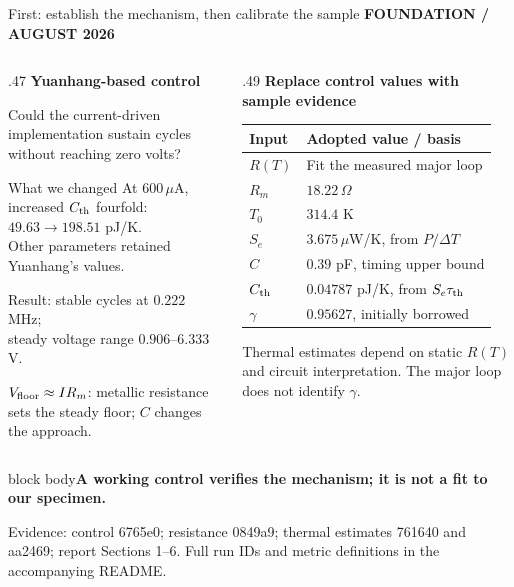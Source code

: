 \documentclass[aspectratio=169,11pt]{beamer}
\newcommand{\eyebrow}[1]{{\color{teal}\scriptsize\bfseries\MakeUppercase{#1}}\par\vspace{2mm}}
\newcommand{\takeaway}[1]{\par\vspace{2mm}\begin{beamercolorbox}[sep=2mm,wd=\linewidth]{block body}\small\bfseries #1\end{beamercolorbox}}
\newcommand{\src}[1]{\par\vfill{\fontsize{6.5}{8}\selectfont\color{muted}Evidence: #1. Full run IDs and metric definitions in the accompanying README.\par}}
\begin{document}
\begin{frame}[t]{First: establish the mechanism, then calibrate the sample}
\eyebrow{Foundation / August 2026}
\begin{columns}[T,onlytextwidth]
\begin{column}{.47\textwidth}
\textbf{Yuanhang-based control}\par\vspace{2mm}
\small Could the current-driven implementation sustain cycles without reaching zero volts?
\vspace{2mm}
\begin{block}{What we changed}
\small At $600\,\mu$A, increased $C_{\rm th}$ fourfold:\\
$49.63\rightarrow198.51$ pJ/K.\\
Other parameters retained Yuanhang's values.
\end{block}
\small Result: stable cycles at $0.222$ MHz;\\
steady voltage range $0.906$--$6.333$ V.\par
\vspace{2mm}
\small\textcolor{teal}{$V_{\rm floor}\approx I R_m$}: metallic resistance sets the steady floor; $C$ changes the approach.
\end{column}
\begin{column}{.49\textwidth}
\textbf{Replace control values with sample evidence}\par\vspace{2mm}
\small
\renewcommand{\arraystretch}{1.32}
\begin{tabular}{@{}ll@{}}
\toprule
Input & Adopted value / basis\\\midrule
$R(T)$ & Fit the measured major loop\\
$R_m$ & $18.22\,\Omega$\\
$T_0$ & $314.4$ K\\
$S_e$ & $3.675\,\mu$W/K, from $P/\Delta T$\\
$C$ & $0.39$ pF, timing upper bound\\
$C_{\rm th}$ & $0.04787$ pJ/K, from $S_e\tau_{\rm th}$\\
$\gamma$ & $0.95627$, initially borrowed\\\bottomrule
\end{tabular}\par
\vspace{1mm}
\scriptsize Thermal estimates depend on static $R(T)$ and circuit interpretation. The major loop does not identify $\gamma$.
\end{column}
\end{columns}
\takeaway{A working control verifies the mechanism; it is not a fit to our specimen.}
\src{control 6765e0; resistance 0849a9; thermal estimates 761640 and aa2469; report Sections 1--6}
\end{frame}
\end{document}
